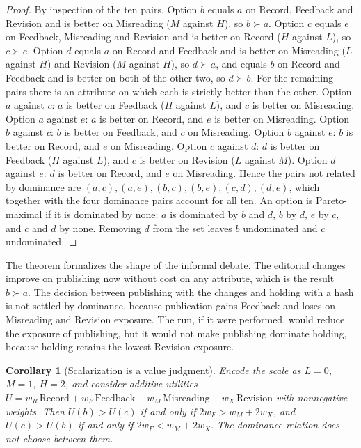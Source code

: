 \documentclass[11pt]{article}
\theoremstyle{plain}
\newtheorem{corollary}[theorem]{Corollary}
\theoremstyle{definition}
\theoremstyle{remark}
\begin{document}
\begin{proof}
By inspection of the ten pairs. Option $b$ equals $a$ on Record, Feedback and Revision and is better on Misreading ($M$ against $H$), so $b\succ a$. Option $c$ equals $e$ on Feedback, Misreading and Revision and is better on Record ($H$ against $L$), so $c\succ e$. Option $d$ equals $a$ on Record and Feedback and is better on Misreading ($L$ against $H$) and Revision ($M$ against $H$), so $d\succ a$, and equals $b$ on Record and Feedback and is better on both of the other two, so $d\succ b$. For the remaining pairs there is an attribute on which each is strictly better than the other. Option $a$ against $c$: $a$ is better on Feedback ($H$ against $L$), and $c$ is better on Misreading. Option $a$ against $e$: $a$ is better on Record, and $e$ is better on Misreading. Option $b$ against $c$: $b$ is better on Feedback, and $c$ on Misreading. Option $b$ against $e$: $b$ is better on Record, and $e$ on Misreading. Option $c$ against $d$: $d$ is better on Feedback ($H$ against $L$), and $c$ is better on Revision ($L$ against $M$). Option $d$ against $e$: $d$ is better on Record, and $e$ on Misreading. Hence the pairs not related by dominance are $(a,c),(a,e),(b,c),(b,e),(c,d),(d,e)$, which together with the four dominance pairs account for all ten. An option is Pareto-maximal if it is dominated by none: $a$ is dominated by $b$ and $d$, $b$ by $d$, $e$ by $c$, and $c$ and $d$ by none. Removing $d$ from the set leaves $b$ undominated and $c$ undominated. \qedhere
\end{proof}

The theorem formalizes the shape of the informal debate. The editorial changes improve on publishing now without cost on any attribute, which is the result $b\succ a$. The decision between publishing with the changes and holding with a hash is not settled by dominance, because publication gains Feedback and loses on Misreading and Revision exposure. The run, if it were performed, would reduce the exposure of publishing, but it would not make publishing dominate holding, because holding retains the lowest Revision exposure.

\begin{corollary}[Scalarization is a value judgment]\label{cor:scalar}
Encode the scale as $L=0$, $M=1$, $H=2$, and consider additive utilities $U=w_R\,\mathrm{Record}+w_F\,\mathrm{Feedback}-w_M\,\mathrm{Misreading}-w_X\,\mathrm{Revision}$ with nonnegative weights. Then $U(b)>U(c)$ if and only if $2w_F>w_M+2w_X$, and $U(c)>U(b)$ if and only if $2w_F<w_M+2w_X$. The dominance relation does not choose between them.
\end{corollary}
\end{document}
